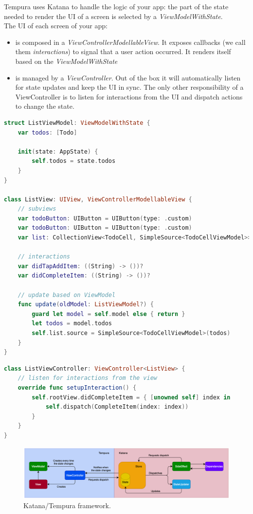 \documentclass[a4paper, 11pt, parskip=half]{scrreprt}
\theoremstyle{definition}
\begin{document}
Tempura uses Katana to handle the logic of your app: the part of the state needed to render the UI of a screen is selected by a \textit{ViewModelWithState}.
\\The UI of each screen of your app:
\begin{itemize}
	\item  is composed in a \textit{ViewControllerModellableView}. It exposes callbacks (we call them \textit{interactions}) to signal that a user action occurred. It renders itself based on the \textit{ViewModelWithState}
	\item is managed by a \textit{ViewController}. Out of the box it will automatically listen for state updates and keep the UI in sync. The only other responsibility of a ViewController is to listen for interactions from the UI and dispatch actions to change the state.
\end{itemize}

\begin{lstlisting}[language=swift]
struct ListViewModel: ViewModelWithState {
    var todos: [Todo]
    
    init(state: AppState) {
        self.todos = state.todos
    }
}

class ListView: UIView, ViewControllerModellableView {
    // subviews
    var todoButton: UIButton = UIButton(type: .custom)
    var todoButton: UIButton = UIButton(type: .custom)
    var list: CollectionView<TodoCell, SimpleSource<TodoCellViewModel>>
    
    // interactions
    var didTapAddItem: ((String) -> ())?
    var didCompleteItem: ((String) -> ())?
    
    // update based on ViewModel
    func update(oldModel: ListViewModel?) {
        guard let model = self.model else { return }
        let todos = model.todos
        self.list.source = SimpleSource<TodoCellViewModel>(todos)
    }
}
\end{lstlisting}
\newpage
\begin{lstlisting}[language=swift]
class ListViewController: ViewController<ListView> {
    // listen for interactions from the view
    override func setupInteraction() {
        self.rootView.didCompleteItem = { [unowned self] index in
            self.dispatch(CompleteItem(index: index))
        }
    }
}
\end{lstlisting}

\begin{figure}[H]
    \centering
    \includegraphics[width=1\linewidth, keepaspectratio]{Katana-Tempura}
    \caption{Katana/Tempura framework.}
\end{figure}
\end{document}
